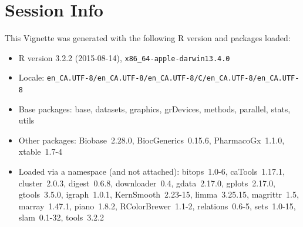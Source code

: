 \documentclass[11pt]{article}
\begin{document}
\section*{Session Info}

This Vignette was generated with the following R version and packages loaded:

\begin{itemize}\raggedright
  \item R version 3.2.2 (2015-08-14), \verb|x86_64-apple-darwin13.4.0|
  \item Locale: \verb|en_CA.UTF-8/en_CA.UTF-8/en_CA.UTF-8/C/en_CA.UTF-8/en_CA.UTF-8|
  \item Base packages: base, datasets, graphics, grDevices, methods,
    parallel, stats, utils
  \item Other packages: Biobase~2.28.0, BiocGenerics~0.15.6,
    PharmacoGx~1.1.0, xtable~1.7-4
  \item Loaded via a namespace (and not attached): bitops~1.0-6,
    caTools~1.17.1, cluster~2.0.3, digest~0.6.8, downloader~0.4,
    gdata~2.17.0, gplots~2.17.0, gtools~3.5.0, igraph~1.0.1,
    KernSmooth~2.23-15, limma~3.25.15, magrittr~1.5, marray~1.47.1,
    piano~1.8.2, RColorBrewer~1.1-2, relations~0.6-5, sets~1.0-15,
    slam~0.1-32, tools~3.2.2
\end{itemize}


\end{document}
